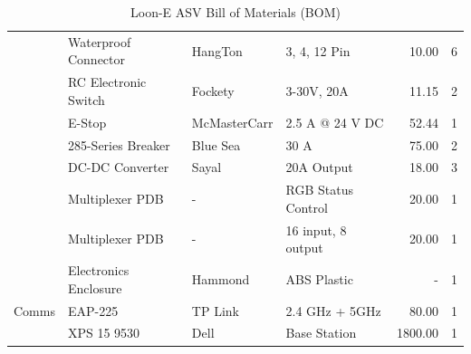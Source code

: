 \begin{table}[H]
\begin{tabular}{|l|l|l|p{3cm}|r|c|}
        & Waterproof Connector & HangTon & 3, 4, 12 Pin & 10.00 & 6 \\
        & RC Electronic Switch & Fockety & 3-30V, 20A & 11.15 & 2 \\
        & E-Stop & McMasterCarr & 2.5 A @ 24 V DC & 52.44 & 1 \\
        & 285-Series Breaker & Blue Sea & 30 A & 75.00 & 2 \\
        & DC-DC Converter & Sayal & 20A Output & 18.00 & 3 \\
        & Multiplexer PDB & - & RGB Status Control & 20.00 & 1 \\
        & Multiplexer PDB & - & 16 input, 8 output & 20.00 & 1 \\
        & Electronics Enclosure & Hammond & ABS Plastic & - & 1 \\
        \hline
        Comms & EAP-225 & TP Link & 2.4 GHz + 5GHz & 80.00 & 1 \\
        & XPS 15 9530 & Dell & Base Station & 1800.00 & 1 \\
        \hline
    \end{tabular}
    \caption{Loon-E ASV Bill of Materials (BOM)}
    \label{tab:components-list}
\end{table}